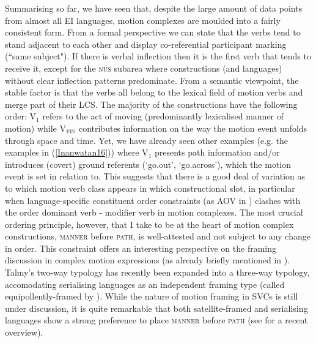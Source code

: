 Summarising so far, we have seen that, despite the large amount of data points from almost all EI languages, motion complexes are moulded into a fairly consistent form. From a formal perspective we can state that the verbs tend to stand adjacent to each other and display co-referential participant marking (``same subject"). If there is verbal inflection then it is the first verb that tends to receive it, except for the \textsc{nus} subarea where constructions (and languages) without clear inflection patterns predominate. From a semantic viewpoint, the stable factor is that the verbs all belong to the lexical field of motion verbs and merge part of their LCS. The majority of the constructions have the following order: V$_{1}$ refers to the act of moving (predominantly lexicalised manner of motion) while V$_{\textsc{fin}}$ contributes information on the way the motion event unfolds through space and time. Yet, we have already seen other examples (e.g. the  examples in (\ref{Inanwatan16})) where V$_{1}$ presents path information and/or introduces (covert) ground referents (`go.out', `go.across'), which the motion event is set in relation to. This suggests that there is a good deal of variation as to which motion verb class appears in which constructional slot, in particular when language-specific constituent order constraints (as AOV in ) clashes with the order dominant verb - modifier verb in motion complexes. The most crucial ordering principle, however, that I take to be at the heart of motion complex constructions, \textsc{manner} before \textsc{path}, is well-attested and not subject to any change in order. This constraint offers an interesting perspective on the framing discussion in complex motion expressions (as already briefly mentioned in ). Talmy's two-way typology \citep{talmy1985lexicalization, talmy2000toward} has recently been expanded into a three-way typology, accomodating serialising languages as an independent framing type (called equipollently-framed by \citealt{slobin2004many}). While the nature of motion framing in SVCs is still under discussion, it is quite remarkable that both satellite-framed and serialising languages show a strong preference to place \textsc{manner} before \textsc{path} (see \citealt{Ameka2013} for a recent overview).

